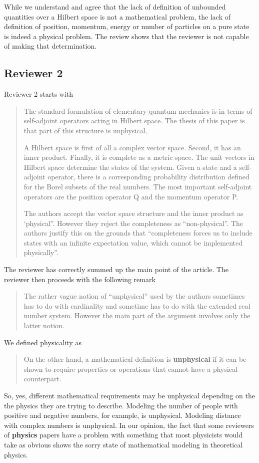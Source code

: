 \documentclass[11pt, executivepaper]{article}
\begin{document}
While we understand and agree that the lack of definition of unbounded quantities over a Hilbert space is not a mathematical problem, the lack of definition of position, momentum, energy or number of particles on a pure state is indeed a physical problem. The review shows that the reviewer is not capable of making that determination.

\subsection*{Reviewer 2}

Reviewer 2 starts with
\begin{quote}
The standard formulation of elementary quantum mechanics is in terms of
self-adjoint operators acting in Hilbert space. The thesis of this paper is that
part of this structure is unphysical.

A Hilbert space is first of all a complex vector space. Second, it has an
inner product. Finally, it is complete as a metric space. The unit vectors in
Hilbert space determine the states of the system. Given a state and a self-adjoint
operator, there is a corresponding probability distribution defined for the Borel
subsets of the real numbers. The most important self-adjoint operators are the
position operator Q and the momentum operator P.

The authors accept the vector space structure and the inner product as
‘physical”. However they reject the completeness as “non-physical”. The authors
justify this on the grounds that “completeness forces us to include states
with an infinite expectation value, which cannot be implemented physically”.
\end{quote}
The reviewer has correctly summed up the main point of the article.  The reviewer then proceeds with the following remark
\begin{quote}
The rather vague notion of “unphysical” used by the authors sometimes has
to do with cardinality and sometime has to do with the extended real number
system. However the main part of the argument involves only the latter notion.
\end{quote}
We defined physicality as
\begin{quote}
	On the other
	hand, a mathematical definition is \textbf{unphysical} if it can
	be shown to require properties or operations that cannot
	have a physical counterpart.
\end{quote}
So, yes, different mathematical requirements may be unphysical depending on the the physics they are trying to describe. Modeling the number of people with positive and negative numbers, for example, is unphysical. Modeling distance with complex numbers is unphysical. In our opinion, the fact that some reviewers of \textbf{physics} papers have a problem with something that most physicists would take as obvious shows the sorry state of mathematical modeling in theoretical physics.
\end{document}
